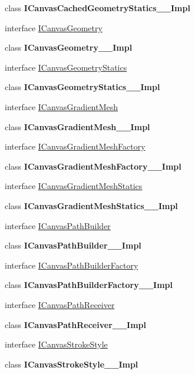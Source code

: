 \begin{DoxyCompactItemize}
\item 
class {\bfseries I\+Canvas\+Cached\+Geometry\+Statics\+\_\+\+\_\+\+Impl}
\item 
interface \hyperlink{interface_microsoft_1_1_graphics_1_1_canvas_1_1_geometry_1_1_i_canvas_geometry}{I\+Canvas\+Geometry}
\item 
class {\bfseries I\+Canvas\+Geometry\+\_\+\+\_\+\+Impl}
\item 
interface \hyperlink{interface_microsoft_1_1_graphics_1_1_canvas_1_1_geometry_1_1_i_canvas_geometry_statics}{I\+Canvas\+Geometry\+Statics}
\item 
class {\bfseries I\+Canvas\+Geometry\+Statics\+\_\+\+\_\+\+Impl}
\item 
interface \hyperlink{interface_microsoft_1_1_graphics_1_1_canvas_1_1_geometry_1_1_i_canvas_gradient_mesh}{I\+Canvas\+Gradient\+Mesh}
\item 
class {\bfseries I\+Canvas\+Gradient\+Mesh\+\_\+\+\_\+\+Impl}
\item 
interface \hyperlink{interface_microsoft_1_1_graphics_1_1_canvas_1_1_geometry_1_1_i_canvas_gradient_mesh_factory}{I\+Canvas\+Gradient\+Mesh\+Factory}
\item 
class {\bfseries I\+Canvas\+Gradient\+Mesh\+Factory\+\_\+\+\_\+\+Impl}
\item 
interface \hyperlink{interface_microsoft_1_1_graphics_1_1_canvas_1_1_geometry_1_1_i_canvas_gradient_mesh_statics}{I\+Canvas\+Gradient\+Mesh\+Statics}
\item 
class {\bfseries I\+Canvas\+Gradient\+Mesh\+Statics\+\_\+\+\_\+\+Impl}
\item 
interface \hyperlink{interface_microsoft_1_1_graphics_1_1_canvas_1_1_geometry_1_1_i_canvas_path_builder}{I\+Canvas\+Path\+Builder}
\item 
class {\bfseries I\+Canvas\+Path\+Builder\+\_\+\+\_\+\+Impl}
\item 
interface \hyperlink{interface_microsoft_1_1_graphics_1_1_canvas_1_1_geometry_1_1_i_canvas_path_builder_factory}{I\+Canvas\+Path\+Builder\+Factory}
\item 
class {\bfseries I\+Canvas\+Path\+Builder\+Factory\+\_\+\+\_\+\+Impl}
\item 
interface \hyperlink{interface_microsoft_1_1_graphics_1_1_canvas_1_1_geometry_1_1_i_canvas_path_receiver}{I\+Canvas\+Path\+Receiver}
\item 
class {\bfseries I\+Canvas\+Path\+Receiver\+\_\+\+\_\+\+Impl}
\item 
interface \hyperlink{interface_microsoft_1_1_graphics_1_1_canvas_1_1_geometry_1_1_i_canvas_stroke_style}{I\+Canvas\+Stroke\+Style}
\item 
class {\bfseries I\+Canvas\+Stroke\+Style\+\_\+\+\_\+\+Impl}
\end{DoxyCompactItemize}
